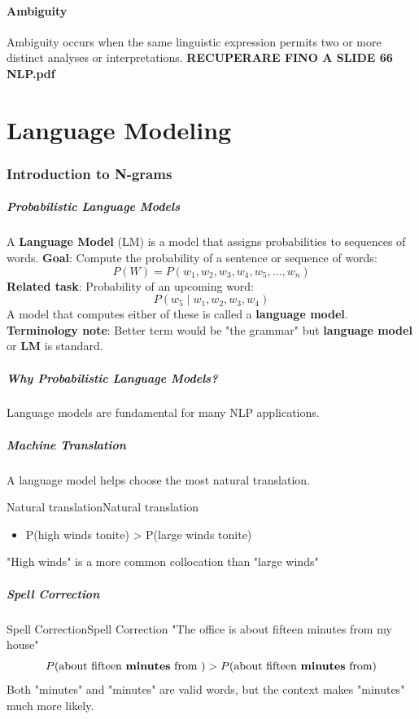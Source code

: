 \documentclass[a4paper]{article}
\theoremstyle{definition}
\begin{document}
\subsection{Ambiguity}
Ambiguity occurs when the same linguistic expression permits two or more distinct analyses or interpretations.
\textbf{RECUPERARE FINO A SLIDE 66 NLP.pdf}
\part{Language Modeling}
\section{Introduction to N-grams}
\subsubsection{Probabilistic Language Models}
A \textbf{Language Model} (LM) is a model that assigns probabilities to sequences of words.
\vspace{1em}
\noindent
\newline
\textbf{Goal}: Compute the probability of a sentence or sequence of words:
\[
  P(W) = P(w_1,w_2,w_3,w_4,w_5, \ldots, w_n)
\]
\textbf{Related task}: Probability of an upcoming word:
\[
  P(w_5 \;|\; w_1,w_2,w_3,w_4)
\]
A model that computes either of these is called a \textbf{language model}.
\vspace{1em}
\noindent
\newline
\textbf{Terminology note}: Better term would be "the grammar" but \textbf{language model} or 
\textbf{LM} is standard.
\subsubsection{Why Probabilistic Language Models?}
Language models are fundamental for many NLP applications.
\subsubsection{Machine Translation}
A language model helps choose the most natural translation.
\begin{example}{Natural translation}{Natural translation}
\begin{itemize}
    \item P(high winds tonite) > P(large winds tonite)
\end{itemize}
"High winds" is a more common collocation than "large winds"
\end{example}
\subsubsection{Spell Correction}
\begin{example}{Spell Correction}{Spell Correction}
"The office is about fifteen minutes from my house"
\[
  P(\text{about fifteen \textbf{minutes} from }) > P(\text{about fifteen \textbf{minutes} from})
\]
Both "minutes" and "minutes" are valid words, but the context makes "minutes" much more likely.
\end{example}
\end{document}
